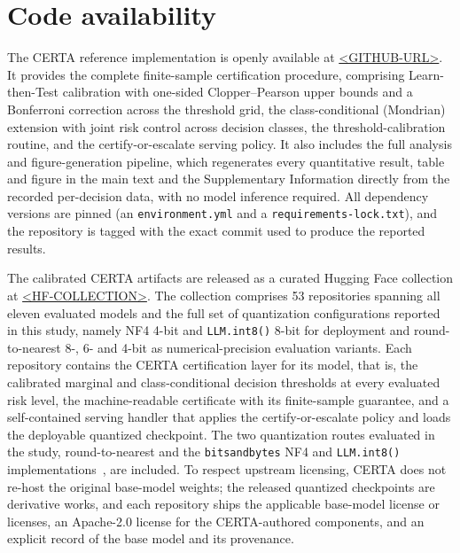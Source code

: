 
\section*{Code availability}

The CERTA reference implementation is openly available at \url{<GITHUB-URL>}. It provides the complete
finite-sample certification procedure, comprising Learn-then-Test calibration with one-sided
Clopper--Pearson upper bounds and a Bonferroni correction across the threshold grid, the class-conditional
(Mondrian) extension with joint risk control across decision classes, the threshold-calibration routine,
and the certify-or-escalate serving policy. It also includes the full analysis and figure-generation
pipeline, which regenerates every quantitative result, table and figure in the main text and the
Supplementary Information directly from the recorded per-decision data, with no model inference required.
All dependency versions are pinned (an \texttt{environment.yml} and a \texttt{requirements-lock.txt}), and
the repository is tagged with the exact commit used to produce the reported results.

The calibrated CERTA artifacts are released as a curated Hugging Face collection at \url{<HF-COLLECTION>}.
The collection comprises 53 repositories spanning all eleven evaluated models and the full set of
quantization configurations reported in this study, namely NF4 4-bit and \texttt{LLM.int8()} 8-bit for
deployment and round-to-nearest 8-, 6- and 4-bit as numerical-precision evaluation variants. Each
repository contains the CERTA certification layer for its model, that is, the calibrated marginal and
class-conditional decision thresholds at every evaluated risk level, the machine-readable certificate with
its finite-sample guarantee, and a self-contained serving handler that applies the certify-or-escalate
policy and loads the deployable quantized checkpoint. The two quantization routes evaluated in the study,
round-to-nearest and the \texttt{bitsandbytes} NF4 and \texttt{LLM.int8()}
implementations~\cite{dettmers2023qlora,dettmers2022llmint8}, are included. To respect upstream licensing,
CERTA does not re-host the original base-model weights; the released quantized checkpoints are derivative
works, and each repository ships the applicable base-model license or licenses, an Apache-2.0 license for
the CERTA-authored components, and an explicit record of the base model and its provenance.

